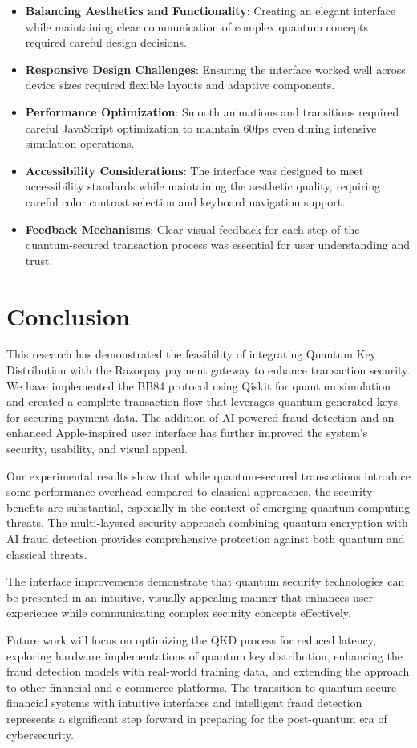 \documentclass[conference]{IEEEtran}
\begin{document}
\begin{itemize}
    \item \textbf{Balancing Aesthetics and Functionality}: Creating an elegant interface while maintaining clear communication of complex quantum concepts required careful design decisions.
    
    \item \textbf{Responsive Design Challenges}: Ensuring the interface worked well across device sizes required flexible layouts and adaptive components.
    
    \item \textbf{Performance Optimization}: Smooth animations and transitions required careful JavaScript optimization to maintain 60fps even during intensive simulation operations.
    
    \item \textbf{Accessibility Considerations}: The interface was designed to meet accessibility standards while maintaining the aesthetic quality, requiring careful color contrast selection and keyboard navigation support.
    
    \item \textbf{Feedback Mechanisms}: Clear visual feedback for each step of the quantum-secured transaction process was essential for user understanding and trust.
\end{itemize}

\section{Conclusion}
This research has demonstrated the feasibility of integrating Quantum Key Distribution with the Razorpay payment gateway to enhance transaction security. We have implemented the BB84 protocol using Qiskit for quantum simulation and created a complete transaction flow that leverages quantum-generated keys for securing payment data. The addition of AI-powered fraud detection and an enhanced Apple-inspired user interface has further improved the system's security, usability, and visual appeal.

Our experimental results show that while quantum-secured transactions introduce some performance overhead compared to classical approaches, the security benefits are substantial, especially in the context of emerging quantum computing threats. The multi-layered security approach combining quantum encryption with AI fraud detection provides comprehensive protection against both quantum and classical threats.

The interface improvements demonstrate that quantum security technologies can be presented in an intuitive, visually appealing manner that enhances user experience while communicating complex security concepts effectively.

Future work will focus on optimizing the QKD process for reduced latency, exploring hardware implementations of quantum key distribution, enhancing the fraud detection models with real-world training data, and extending the approach to other financial and e-commerce platforms. The transition to quantum-secure financial systems with intuitive interfaces and intelligent fraud detection represents a significant step forward in preparing for the post-quantum era of cybersecurity.
\end{document}
